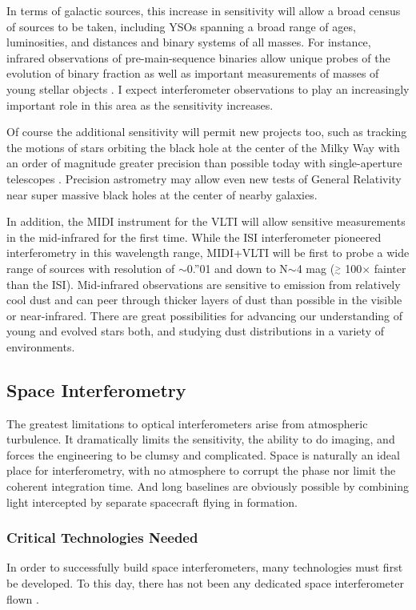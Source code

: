 \documentclass[12pt]{article}
\newcommand{\simge}{\mbox{$\stackrel{>}{_{\sim}}$}}
\begin{document}
In terms of galactic sources, this increase in sensitivity will allow
a broad census of sources to be taken, including YSOs spanning a broad
range of ages, luminosities, and distances and binary systems of all
masses.  For instance, infrared observations of pre-main-sequence
binaries allow unique probes of the evolution of binary fraction
\citep[e.g.,][]{ghez1993} as well as important measurements of masses
of young stellar objects \citep{tamazian2002}.  I expect
interferometer observations to play an increasingly important role in
this area as the sensitivity increases.

Of course the additional sensitivity will permit new projects too,
such as tracking the motions of stars orbiting the black hole at the
center of the Milky Way with an order of magnitude greater precision
than possible today with single-aperture telescopes
\citep[e.g.,][]{genzel2002}.  Precision astrometry may allow even new
tests of General Relativity near super massive black holes at the
center of nearby galaxies.

In addition, the MIDI instrument for the VLTI will allow sensitive
measurements in the mid-infrared for the first time. While the ISI
interferometer pioneered interferometry in this wavelength range,
MIDI+VLTI will be first to probe a wide range of sources with
resolution of $\sim$0.''01 and down to N$\sim$4 mag ($\simge$
100$\times$ fainter than the ISI).  Mid-infrared observations are
sensitive to emission from relatively cool dust and can peer through
thicker layers of dust than possible in the visible or near-infrared.
There are great possibilities for advancing our understanding of young
and evolved stars both, and studying dust distributions in a variety
of environments.

\subsection{Space Interferometry}
\label{spaceinterferometers}

The greatest limitations to optical interferometers arise from
atmospheric turbulence.  It dramatically limits the sensitivity, the
ability to do imaging, and forces the engineering to be clumsy and
complicated.  Space is naturally an ideal place for interferometry,
with no atmosphere to corrupt the phase nor limit the coherent
integration time. And long baselines are obviously possible by
combining light intercepted by separate spacecraft flying in
formation.

\subsubsection{Critical Technologies Needed}
In order to successfully build space interferometers, many
technologies must first be developed.  To this day, there has not been
any dedicated space interferometer flown \citep[except for the Fine
Guidance Sensors on the Hubble Space Telescopes; e.g.][]{franz1991}.
\end{document}
